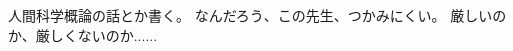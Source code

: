 \documentclass{article}
\begin{document}
人間科学概論の話とか書く。
なんだろう、この先生、つかみにくい。
厳しいのか、厳しくないのか......
\end{document}
